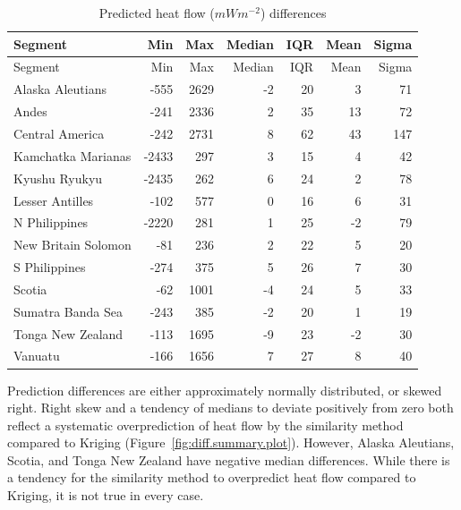 \documentclass[draft,linenumbers]{agujournal2018}
\begin{document}
\hypertarget{tbl:diff.summary.table}{}
\begin{longtable}[]{@{}lrrrrrr@{}}
\caption{\label{tbl:diff.summary.table}Predicted heat flow
(\(mWm^{-2}\)) differences}\tabularnewline
\toprule
Segment & Min & Max & Median & IQR & Mean & Sigma \\
\midrule
\endfirsthead
\toprule
Segment & Min & Max & Median & IQR & Mean & Sigma \\
\midrule
\endhead
Alaska Aleutians & -555 & 2629 & -2 & 20 & 3 & 71 \\
Andes & -241 & 2336 & 2 & 35 & 13 & 72 \\
Central America & -242 & 2731 & 8 & 62 & 43 & 147 \\
Kamchatka Marianas & -2433 & 297 & 3 & 15 & 4 & 42 \\
Kyushu Ryukyu & -2435 & 262 & 6 & 24 & 2 & 78 \\
Lesser Antilles & -102 & 577 & 0 & 16 & 6 & 31 \\
N Philippines & -2220 & 281 & 1 & 25 & -2 & 79 \\
New Britain Solomon & -81 & 236 & 2 & 22 & 5 & 20 \\
S Philippines & -274 & 375 & 5 & 26 & 7 & 30 \\
Scotia & -62 & 1001 & -4 & 24 & 5 & 33 \\
Sumatra Banda Sea & -243 & 385 & -2 & 20 & 1 & 19 \\
Tonga New Zealand & -113 & 1695 & -9 & 23 & -2 & 30 \\
Vanuatu & -166 & 1656 & 7 & 27 & 8 & 40 \\
\bottomrule
\end{longtable}

Prediction differences are either approximately normally distributed, or
skewed right. Right skew and a tendency of medians to deviate positively
from zero both reflect a systematic overprediction of heat flow by the
similarity method compared to Kriging
(Figure~\ref{fig:diff.summary.plot}). However, Alaska Aleutians, Scotia,
and Tonga New Zealand have negative median differences. While there is a
tendency for the similarity method to overpredict heat flow compared to
Kriging, it is not true in every case.
\end{document}
